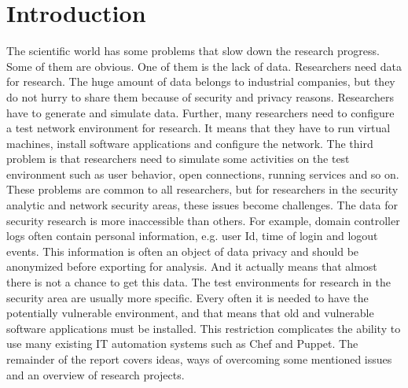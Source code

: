 \section{Introduction}

The scientific world has some problems that slow down the research progress. Some of them are obvious. One of them is the lack of data. Researchers need data for research. The huge amount of data belongs to industrial companies, but they do not hurry to share them because of security and privacy reasons. Researchers have to generate and simulate data. Further, many researchers need to configure a test network environment for research. It means that they have to run virtual machines, install software applications and configure the network. The third problem is that researchers need to simulate some activities on the test environment such as user behavior, open connections, running services and so on. These problems are common to all researchers, but for researchers in the security analytic and network security areas, these issues become challenges. The data for security research is more inaccessible than others. For example, domain controller logs often contain personal information, e.g. user Id, time of login and logout events. This information is often an object of data privacy and should be anonymized before exporting for analysis. And it actually means that almost there is not a chance to get this data. The test environments for research in the security area are usually more specific. Every often it is needed to have the potentially vulnerable environment, and that means that old and vulnerable software applications must be installed. This restriction complicates the ability to use many existing IT automation systems such as Chef and Puppet. The remainder  of the report covers ideas, ways of overcoming some mentioned issues and an overview of research projects.

